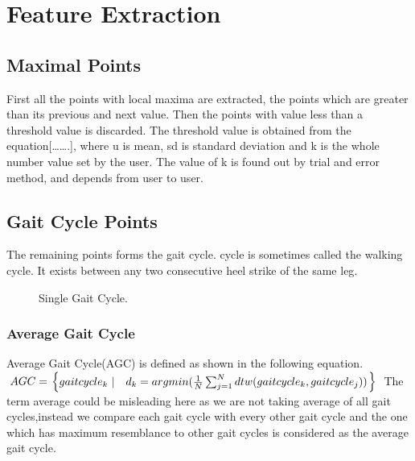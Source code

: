 \chapter{Feature Extraction}\label{final}
\section{Maximal Points}
First all the points with local maxima are extracted, the points which are greater than its previous and next value. Then the points with value less than a threshold value is discarded. The threshold value is obtained from the equation[…….], where u is mean, sd is standard deviation and k is the whole number value set by the user. The value of k is found out by trial and error method, and depends from user to user.

\section{Gait Cycle Points} 
The remaining points forms the gait cycle. cycle is sometimes called the walking cycle. It exists  between any two consecutive heel strike of the same leg\cite{oregonstate}.

\begin{figure}
\cite{oregonstate}
\caption{Single Gait Cycle.}
\end{figure}

\subsection{Average Gait Cycle} 
Average Gait Cycle(AGC)\cite{oregonstate} is defined as shown in the following equation.\\

$\begin{displaystyle}
  AGC = \left.
  \begin{cases}
    gaitcycle_k \ | & d_k = argmin(\frac{1}{N}\sum_{j=1}^{N} dtw(gaitcycle_k,gaitcycle_j))
  \end{cases}
  \right\} 
\end{displaystyle}$ \cite{oregonstate}
\newline
The term average could be misleading here as we are not taking average of all gait cycles,instead we compare each gait cycle with every other gait cycle and the one which has maximum resemblance to other gait cycles is considered as the average gait cycle.

